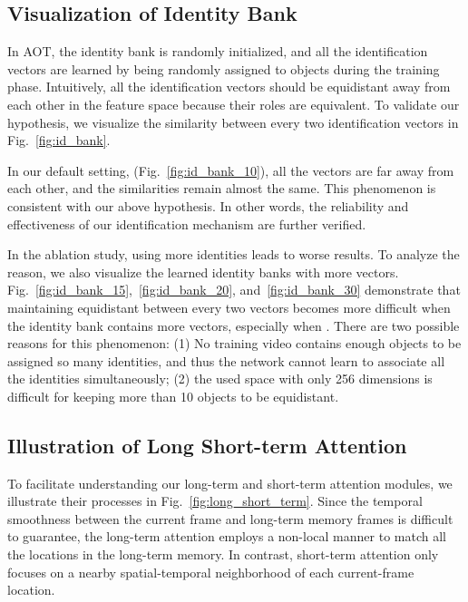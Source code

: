 \documentclass{article}
\begin{document}
\subsection{Visualization of Identity Bank}
In AOT, the identity bank is randomly initialized, and all the  identification vectors are learned by being randomly assigned to objects during the training phase. Intuitively, all the identification vectors should be equidistant away from each other in the feature space because their roles are equivalent. To validate our hypothesis, we visualize the similarity between every two identification vectors in Fig.~\ref{fig:id_bank}.

In our default setting,  (Fig.~\ref{fig:id_bank_10}), all the vectors are far away from each other, and the similarities remain almost the same. This phenomenon is consistent with our above hypothesis. In other words, the reliability and effectiveness of our identification mechanism are further verified. 

In the ablation study, using more identities leads to worse results. To analyze the reason, we also visualize the learned identity banks with more vectors. Fig.~\ref{fig:id_bank_15},~\ref{fig:id_bank_20}, and~\ref{fig:id_bank_30} demonstrate that maintaining equidistant between every two vectors becomes more difficult when the identity bank contains more vectors, especially when . There are two possible reasons for this phenomenon: (1) No training video contains enough objects to be assigned so many identities, and thus the network cannot learn to associate all the identities simultaneously; (2) the used space with only 256 dimensions is difficult for keeping more than 10 objects to be equidistant. 



\subsection{Illustration of Long Short-term Attention}
To facilitate understanding our long-term and short-term attention modules, we illustrate their processes in Fig.~\ref{fig:long_short_term}. Since the temporal smoothness between the current frame and long-term memory frames is difficult to guarantee, the long-term attention employs a non-local manner to match all the locations in the long-term memory. In contrast, short-term attention only focuses on a nearby spatial-temporal neighborhood of each current-frame location.
\end{document}
